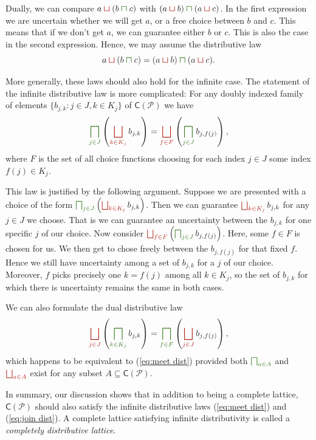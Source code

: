 \documentclass[12pt]{article}
\theoremstyle{definition}
\theoremstyle{plain}
\theoremstyle{plain}
\theoremstyle{plain}
\theoremstyle{plain}
\theoremstyle{remark}
\theoremstyle{remark}
\newcommand{\mc}[1]{\mathcal{#1}}
\newcommand{\sub}{\subseteq}
\newcommand{\cbigsqcap}[1]{\color{OliveGreen}\bigsqcap_{#1}\color{Black}}
\newcommand{\csqcap}{\color{OliveGreen}\bm{\sqcap}\color{Black}}
\newcommand{\cbigsqcup}[1]{\color{BrickRed}\bigsqcup_{#1}\color{Black}}
\newcommand{\csqcup}{\color{BrickRed}\bm{\sqcup}\color{Black}}
\begin{document}
Dually, we can compare $a \csqcup (b \csqcap c)$ with $(a \csqcup b) \csqcap (a \csqcup c)$. In the first expression we are uncertain whether we will get $a$, or a free choice between $b$ and $c$. This means that if we don't get $a$, we can guarantee either $b$ or $c$. This is also the case in the second expression. Hence, we may assume the distributive law $$a \csqcup (b \csqcap c) = (a \csqcup b) \csqcap (a \csqcup c).$$

More generally, these laws should also hold for the infinite case. The statement of the infinite distributive law is more complicated: For any doubly indexed family of elements $\{b_{j,k} : j \in J, k \in K_j\}$ of $\mathsf{C}(\mc{P})$ we have
\begin{equation}\label{eq:meet dist}
	\cbigsqcap{j \in J} \left( \cbigsqcup{k \in K_j} b_{j,k} \right) = \cbigsqcup{f \in F} \left( \cbigsqcap{j \in J} b_{j,f(j)} \right),
\end{equation}
where $F$ is the set of all choice functions choosing for each index $j \in J$ some index $f(j) \in K_j$.

This law is justified by the following argument. Suppose we are presented with a choice of the form $\cbigsqcap{j \in J} \left( \cbigsqcup{k \in K_j} b_{j,k} \right)$. Then we can guarantee $\cbigsqcup{k \in K_j} b_{j,k} $ for any $j \in J$ we choose. That is we can guarantee an uncertainty between the $b_{j,k}$ for one specific $j$ of our choice. Now consider $\cbigsqcup{f \in F} \left( \cbigsqcap{j \in J} b_{j,f(j)} \right)$. Here, some $f \in F$ is chosen for us. We then get to chose freely between the $b_{j,f(j)}$ for that fixed $f$. Hence we still have uncertainty among a set of $b_{j,k}$ for a $j$ of our choice. Moreover, $f$ picks precisely one $k = f(j)$ among all $k \in K_j$, so the set of $b_{j,k}$ for which there is uncertainty remains the same in both cases.

We can also formulate the dual distributive law
\begin{equation}\label{eq:join dist}
\cbigsqcup{j \in J} \left( \cbigsqcap{k \in K_j} b_{j,k} \right) = \cbigsqcap{f \in F} \left( \cbigsqcup{j \in J} b_{j,f(j)} \right),
\end{equation}
which happens to be equivalent to (\ref{eq:meet dist}) provided both $\cbigsqcap{a \in A}$ and $\cbigsqcup{a \in A}$ exist for any subset $A \sub \mathsf{C}(\mc{P})$.

In summary, our discussion shows that in addition to being a complete lattice, $\mathsf{C}(\mc{P})$ should also satisfy the infinite distributive laws (\ref{eq:meet dist}) and (\ref{eq:join dist}). A complete lattice satisfying infinite distributivity is called a \emph{completely distributive lattice}.
\end{document}

